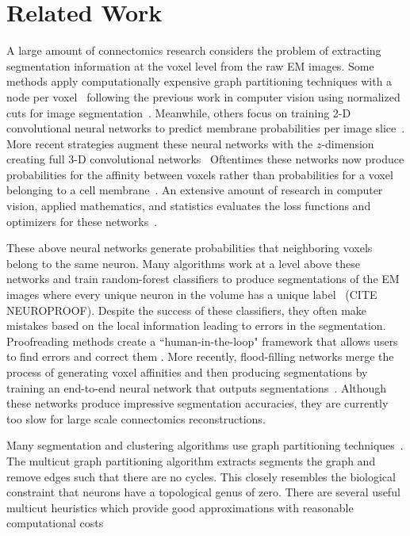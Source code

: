 \section{Related Work}

A large amount of connectomics research considers the problem of extracting segmentation information at the voxel level from the raw EM images. 
Some methods apply computationally expensive graph partitioning techniques with a node per voxel~\cite{andres2012globally} following the previous work in computer vision using normalized cuts for image segmentation~\cite{kappes2016higher,shi2000normalized,tatiraju2008image}. 
Meanwhile, others focus on training 2-D convolutional neural networks to predict membrane probabilities per image slice~\cite{ciresan2012deep}. 
More recent strategies augment these neural networks with the $z$-dimension creating full 3-D convolutional networks~\cite{lee2015recursive}
Oftentimes these networks now produce probabilities for the affinity between voxels rather than probabilities for a voxel belonging to a cell membrane~\cite{ronneberger2015u}. 
An extensive amount of research in computer vision, applied mathematics, and statistics evaluates the loss functions and optimizers for these networks~\cite{chatfield2014return,maas2013rectifier,nesterov1983method}.

These above neural networks generate probabilities that neighboring voxels belong to the same neuron.
Many algorithms work at a level above these networks and train random-forest classifiers to produce segmentations of the EM images where every unique neuron in the volume has a unique label~\cite{seymour2016rhoananet,nunez2014graph,parag2017anisotropic,zlateski2015image} (CITE NEUROPROOF). 
Despite the success of these classifiers, they often make mistakes based on the local information leading to errors in the segmentation. 
Proofreading methods create a ``human-in-the-loop" framework that allows users to find errors and correct them \cite{haehn2017scalable,haehn2017guided,haehn2014design,DBLP:journals/corr/abs-1708-02599}. 
More recently, flood-filling networks merge the process of generating voxel affinities and then producing segmentations by training an end-to-end neural network that outputs segmentations~\cite{januszewski2016flood}. 
Although these networks produce impressive segmentation accuracies, they are currently too slow for large scale connectomics reconstructions. 

Many segmentation and clustering algorithms use graph partitioning techniques~\cite{andres2012globally}. 
The multicut graph partitioning algorithm extracts segments the graph and remove edges such that there are no cycles. 
This closely resembles the biological constraint that neurons have a topological genus of zero. 
There are several useful multicut heuristics which provide good approximations with reasonable computational costs~\cite{horvnakova2017analysis,kernighan1970efficient,keuper2015efficient}

